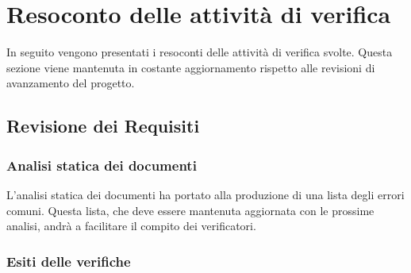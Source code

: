 \section{Resoconto delle attività di verifica}
In seguito vengono presentati i resoconti delle attività di verifica svolte.
Questa sezione viene mantenuta in costante aggiornamento rispetto alle revisioni di avanzamento del progetto.
	\subsection{Revisione dei Requisiti}
		\subsubsection{Analisi statica dei documenti}
		L'analisi statica dei documenti ha portato alla produzione di una lista degli errori comuni. Questa lista, che deve essere mantenuta aggiornata con le prossime analisi, andrà a facilitare il compito dei verificatori.
		\subsubsection{Esiti delle verifiche} 
